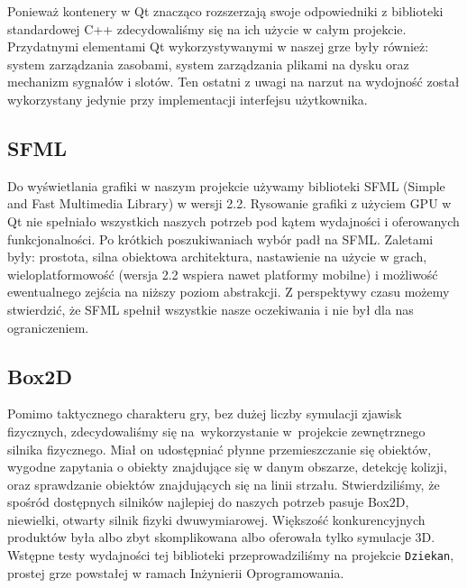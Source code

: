 \documentclass[licencjacka]{pracamgr}
\begin{document}
      Ponieważ kontenery w Qt znacząco rozszerzają swoje odpowiedniki z biblioteki standardowej C++ zdecydowaliśmy się na ich użycie
      w całym projekcie. Przydatnymi elementami Qt wykorzystywanymi w naszej grze były również: system zarządzania zasobami,
      system zarządzania plikami na dysku oraz mechanizm sygnałów i slotów. Ten ostatni z uwagi na narzut na wydojność został 
      wykorzystany jedynie przy implementacji interfejsu użytkownika.

    \subsection{SFML}
      Do wyświetlania grafiki w naszym projekcie używamy biblioteki SFML\cite{SFML} (Simple and Fast Multimedia Library) w wersji
      2.2. Rysowanie grafiki z użyciem GPU w Qt nie spełniało wszystkich naszych potrzeb pod kątem wydajności i oferowanych funkcjonalności.
      Po krótkich poszukiwaniach wybór padł na SFML. Zaletami były: prostota, silna obiektowa architektura, nastawienie na użycie w grach,
      wieloplatformowość (wersja 2.2 wspiera nawet platformy mobilne) i możliwość ewentualnego zejścia na niższy poziom abstrakcji.
      Z perspektywy czasu możemy stwierdzić, że SFML spełnił wszystkie nasze oczekiwania i nie był dla nas ograniczeniem.

    \subsection{Box2D}
      Pomimo taktycznego charakteru gry, bez dużej liczby symulacji zjawisk fizycznych, zdecydowaliśmy się na~wykorzystanie
      w~projekcie zewnętrznego silnika fizycznego. Miał on udostępniać płynne przemieszczanie się obiektów, wygodne
      zapytania o obiekty znajdujące się w danym obszarze, detekcję kolizji, oraz sprawdzanie obiektów znajdujących się na linii
      strzału. Stwierdziliśmy, że spośród dostępnych silników najlepiej do naszych potrzeb pasuje Box2D\cite{BOX}, niewielki,
      otwarty silnik fizyki dwuwymiarowej. Większość konkurencyjnych produktów była albo zbyt skomplikowana albo oferowała tylko
      symulacje 3D. Wstępne testy wydajności tej biblioteki przeprowadziliśmy na projekcie \texttt{Dziekan}, prostej grze powstałej
      w ramach Inżynierii Oprogramowania.
\end{document}
